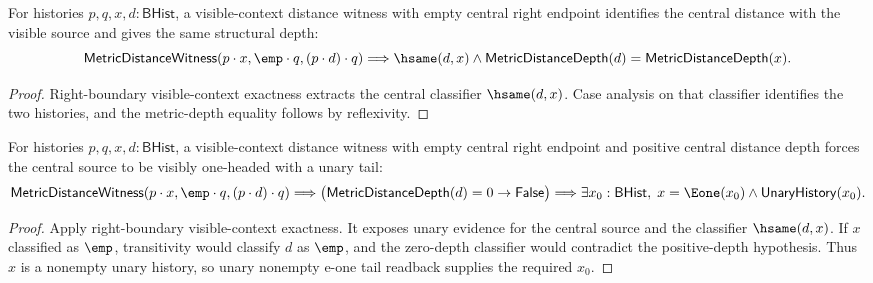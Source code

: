 \begin{theorem}
\label{thm:metric-distance-witness-right-boundary-visible-context-distance-source}
For histories $p,q,x,d:\mathsf{BHist}$, a visible-context distance witness with
empty central right endpoint identifies the central distance with the visible
source and gives the same structural depth:
$$
\mathsf{MetricDistanceWitness}(p\cdot x,\emp\cdot q,(p\cdot d)\cdot q)
\Longrightarrow
\hsame(d,x)\land
\mathsf{MetricDistanceDepth}(d)=\mathsf{MetricDistanceDepth}(x).
$$
\end{theorem}
\begin{proof}
Right-boundary visible-context exactness extracts the central classifier
$\hsame(d,x)$. Case analysis on that classifier identifies the two histories,
and the metric-depth equality follows by reflexivity.
\end{proof}

\begin{theorem}
\label{thm:metric-distance-witness-right-boundary-visible-context-positive-depth-source-e1-shape}
For histories $p,q,x,d:\mathsf{BHist}$, a visible-context distance witness with
empty central right endpoint and positive central distance depth forces the
central source to be visibly one-headed with a unary tail:
$$
\mathsf{MetricDistanceWitness}(p\cdot x,\emp\cdot q,(p\cdot d)\cdot q)
\Longrightarrow
\bigl(\mathsf{MetricDistanceDepth}(d)=0\to\mathsf{False}\bigr)
\Longrightarrow
\exists x_0:\mathsf{BHist},\;
x=\Eone(x_0)\land\mathsf{UnaryHistory}(x_0).
$$
\end{theorem}
\begin{proof}
Apply right-boundary visible-context exactness. It exposes unary evidence for
the central source and the classifier $\hsame(d,x)$. If $x$ classified as
$\emp$, transitivity would classify $d$ as $\emp$, and the zero-depth classifier
would contradict the positive-depth hypothesis. Thus $x$ is a nonempty unary
history, so unary nonempty e-one tail readback supplies the required $x_0$.
\end{proof}

